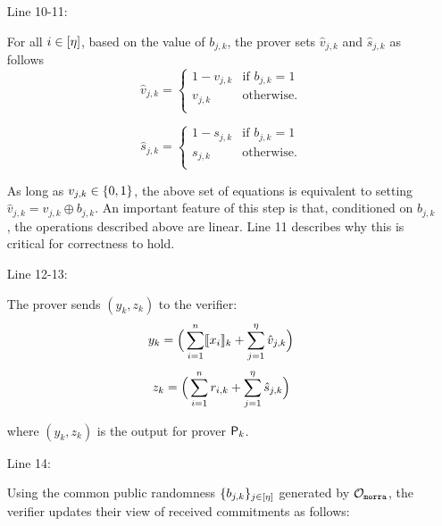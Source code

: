 \begin{enumerate}
\item[Line 10-11:]{For all $i \in [\eta]$, based on the value of $b_{j,k}$, the prover sets $\hat{v}_{j,k}$ and $\hat{s}_{j,k}$ as follows
    \[   
    \hat{v}_{j,k} = 
         \begin{cases}
        1 - v_{j,k} & \text{if } b_{j,k}=1\\
        v_{j,k}& \text{otherwise.} \\ 
     \end{cases}
\]

    \[   
    \hat{s}_{j,k} = 
         \begin{cases}
        1 - s_{j,k} & \text{if } b_{j,k}=1\\
        s_{j,k}& \text{otherwise.} \\ 
     \end{cases}
\]

As long as $v_{j,k} \in \{ 0, 1\}$, the above set of equations is equivalent to setting $\hat{v}_{j,k} = v_{j,k} \oplus b_{j,k}$. An important feature of this step is that, conditioned on $b_{j,k}$, the operations described above are linear. Line 11 describes why this is critical for correctness to hold.
}

    \item[Line 12-13:]{The prover sends $(y_k, z_{k})$ to the verifier:
    \begin{equation}
    y_k = \Big(\sum_{i=1}^n  \llbracket x_i \rrbracket_k + \sum_{j=1}^{\eta} \hat{v}_{j,k} \Big) 
    \end{equation}    
    \begin{equation}
    z_{k} = \Big(\sum_{i=1}^n r_{i,k} + \sum_{j=1}^{\eta} \hat{s}_{j,k}\Big)     
    \end{equation}
    
    where $(y_k, z_{k})$ is the output for prover $\mathsf{P}_k$.
    }

    \item[Line 14:]{Using the common public randomness $\{ b_{j,k} \}_{j \in [\eta]}$ generated by $\mathcal{O}_{\mathtt{morra}}$, the verifier updates their view of received commitments as follows:

}
\end{enumerate}

